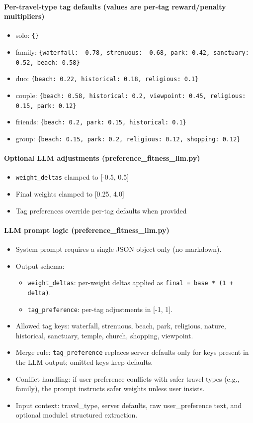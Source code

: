 \documentclass[11pt]{article}
\begin{document}
\paragraph{Per-travel-type tag defaults (values are per-tag reward/penalty multipliers)}
\begin{itemize}
  \item solo: \texttt{\{\}}
  \item family: \texttt{\{waterfall: -0.78, strenuous: -0.68, park: 0.42, sanctuary: 0.52, beach: 0.58\}}
  \item duo: \texttt{\{beach: 0.22, historical: 0.18, religious: 0.1\}}
  \item couple: \texttt{\{beach: 0.58, historical: 0.2, viewpoint: 0.45, religious: 0.15, park: 0.12\}}
  \item friends: \texttt{\{beach: 0.2, park: 0.15, historical: 0.1\}}
  \item group: \texttt{\{beach: 0.15, park: 0.2, religious: 0.12, shopping: 0.12\}}
\end{itemize}

\paragraph{Optional LLM adjustments (preference\_fitness\_llm.py)}
\begin{itemize}
  \item \texttt{weight\_deltas} clamped to [-0.5, 0.5]
  \item Final weights clamped to [0.25, 4.0]
  \item Tag preferences override per-tag defaults when provided
\end{itemize}

\paragraph{LLM prompt logic (preference\_fitness\_llm.py)}
\begin{itemize}
  \item System prompt requires a single JSON object only (no markdown).
  \item Output schema:
  \begin{itemize}
    \item \texttt{weight\_deltas}: per-weight deltas applied as \texttt{final = base * (1 + delta)}.
    \item \texttt{tag\_preference}: per-tag adjustments in [-1, 1].
  \end{itemize}
  \item Allowed tag keys: waterfall, strenuous, beach, park, religious, nature, historical, sanctuary, temple, church, shopping, viewpoint.
  \item Merge rule: \texttt{tag\_preference} replaces server defaults only for keys present in the LLM output; omitted keys keep defaults.
  \item Conflict handling: if user preference conflicts with safer travel types (e.g., family), the prompt instructs safer weights unless user insists.
  \item Input context: travel\_type, server defaults, raw user\_preference text, and optional module1 structured extraction.
\end{itemize}
\end{document}
